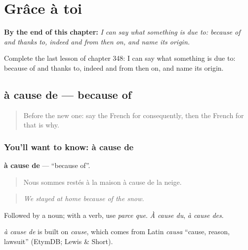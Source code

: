 
\chapter{Grâce à toi}
\label{ch:fr-grace-a-toi}

\begin{chapteropening}
\textbf{By the end of this chapter:} \emph{I can say what something is due to: because of and thanks to, indeed and from then on, and name its origin.}

Complete the last lesson of chapter 348: I can say what something is due to: because of and thanks to, indeed and from then on, and name its origin.
\end{chapteropening}

\section[à cause de]{à cause de — because of}

\label{lesson:FR-C348-a-cause-de}



\begin{quote}
Before the new one: say the French for consequently, then the French for that is why.
\end{quote}

\subsection*{You'll want to know: à cause de}
\textbf{à cause de} — \textquotedblleft{}because of\textquotedblright{}.

\begin{quote}
Nous sommes restés à la maison à cause de la neige.
\end{quote}

\begin{quote}
\emph{We stayed at home because of the snow.}
\end{quote}

Followed by a noun; with a verb, use \emph{parce que}. \emph{À cause du}, \emph{à cause des}.

\begin{cousinweb}
\emph{à cause de} is built on \emph{cause}, which comes from Latin \emph{causa} \textquotedblleft{}cause, reason, lawsuit\textquotedblright{} (EtymDB; Lewis \& Short).
\end{cousinweb}

